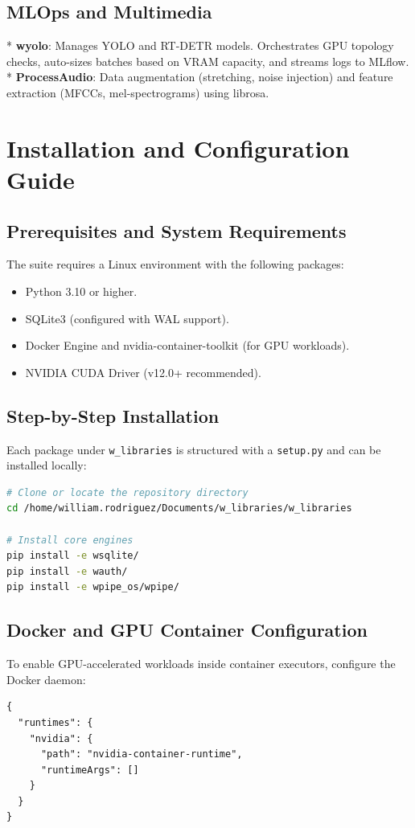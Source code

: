 \documentclass[12pt,a4paper]{report}
\begin{document}
\section{\sffamily MLOps and Multimedia}
* \textbf{wyolo}: Manages YOLO and RT-DETR models. Orchestrates GPU topology checks, auto-sizes batches based on VRAM capacity, and streams logs to MLflow.
* \textbf{ProcessAudio}: Data augmentation (stretching, noise injection) and feature extraction (MFCCs, mel-spectrograms) using librosa.

\cleardoublepage
\chapter{Installation and Configuration Guide}

\section{\sffamily Prerequisites and System Requirements}
The suite requires a Linux environment with the following packages:
\begin{itemize}
    \item Python 3.10 or higher.
    \item SQLite3 (configured with WAL support).
    \item Docker Engine and nvidia-container-toolkit (for GPU workloads).
    \item NVIDIA CUDA Driver (v12.0+ recommended).
\end{itemize}

\section{\sffamily Step-by-Step Installation}
Each package under \texttt{w\_libraries} is structured with a \texttt{setup.py} and can be installed locally:
\begin{lstlisting}[language=bash, caption={Installing w-libraries locally}]
# Clone or locate the repository directory
cd /home/william.rodriguez/Documents/w_libraries/w_libraries

# Install core engines
pip install -e wsqlite/
pip install -e wauth/
pip install -e wpipe_os/wpipe/
\end{lstlisting}

\section{\sffamily Docker and GPU Container Configuration}
To enable GPU-accelerated workloads inside container executors, configure the Docker daemon:
\begin{lstlisting}[caption={Docker daemon GPU configuration}]
{
  "runtimes": {
    "nvidia": {
      "path": "nvidia-container-runtime",
      "runtimeArgs": []
    }
  }
}
\end{lstlisting}
\end{document}
